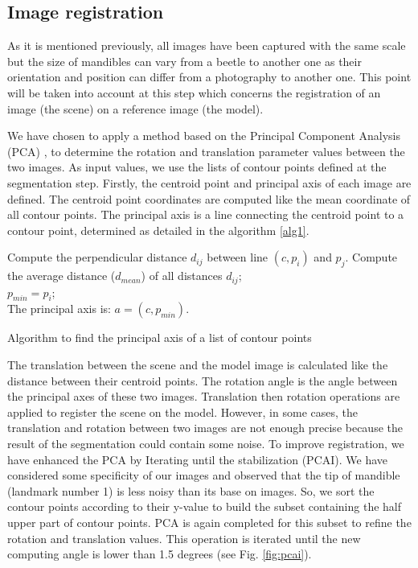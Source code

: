 \documentclass[twoside,twocolumn,10pt]{article}
\begin{document}
\subsection{Image registration}

As it is mentioned previously, all images have been captured with the
same scale but the size of mandibles can vary from a beetle to another
one as their orientation and position can differ from a
photography to another one. This point will be taken into account at
this step which concerns the registration of
an image (the scene) on a reference image (the model).

We have chosen to apply a method based on the Principal Component Analysis (PCA) \cite{bsspca}, \cite{shlens2014tutorial} to determine the rotation and translation parameter values between the two images.
As input values, we use the lists of contour points defined at the segmentation step.
Firstly, the centroid point and principal axis of each image are defined.
The centroid point coordinates are computed like the mean coordinate of all contour points.
The principal axis is a line connecting the centroid point to a
contour point, determined as detailed in the algorithm \ref{alg1}.

\begin{algorithm}
	{
		{
			{
				Compute the perpendicular distance $d_{ij}$ between line $(c,p_i)$ and $p_j$.
			}		
		}
		Compute the average distance ($d_{mean}$) of all distances $d_{ij}$;\\

		{
			$p_{min} = p_i$;\\
		}
	}
	The principal axis is: $a = (c,p_{min})$.
	\caption{Algorithm to find the principal axis of a list of contour points}
	\label{alg1}
\end{algorithm}

The translation between the scene and the model image is calculated like the distance between their centroid
points. The rotation angle is the angle between the principal axes of
these two images. Translation then rotation operations are applied to
register the scene on the model. However, in some cases, the
translation and rotation between two images are 
not enough precise because the result of the segmentation could contain some noise.
To improve registration, we have enhanced the PCA by Iterating until
the stabilization (PCAI).
We have considered some specificity of our images and observed that
the tip of mandible (landmark number 1) is less noisy than its base on images.
So, we sort the contour points according to their y-value to build the subset containing the half upper part of contour points.
PCA is again completed for this subset to refine the rotation and
translation values. This operation is iterated until the new computing
angle is lower than 1.5 degrees (see Fig. \ref{fig:pcai}).
\end{document}
